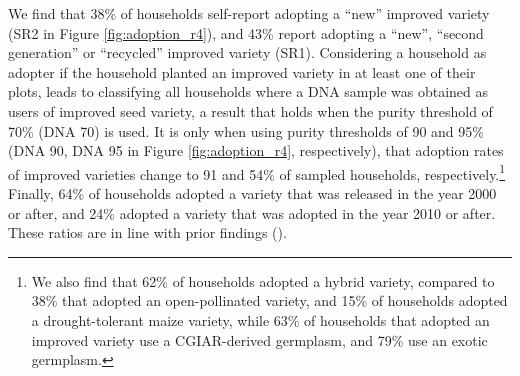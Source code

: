 \documentclass[11pt]{article}
\begin{document}
We find that 38\% of households self-report adopting a “new” improved variety (SR2 in Figure \ref{fig:adoption_r4}), and 43\% report adopting a “new”, “second generation” or “recycled” improved variety (SR1). Considering a household as adopter if the household planted an improved variety in at least one of their plots, leads to classifying all households where a DNA sample was obtained as users of improved seed variety, a result that holds when the purity threshold of 70\% (DNA 70) is used. It is only when using purity thresholds of 90 and 95\% (DNA 90, DNA 95 in Figure \ref{fig:adoption_r4}, respectively), that adoption rates of improved varieties change to 91 and 54\% of sampled households, respectively.\footnote{We also find that 62\% of households adopted a hybrid variety, compared to 38\% that adopted an open-pollinated variety, and 15\% of households adopted a drought-tolerant maize variety, while 63\% of households that adopted an improved variety use a CGIAR-derived germplasm, and 79\% use an exotic germplasm.} Finally, 64\% of households adopted a variety that was released in the year 2000 or after, and 24\% adopted a variety that was adopted in the year 2010 or after. These ratios are in line with prior findings (\citealp{Zeng15}).
\end{document}
